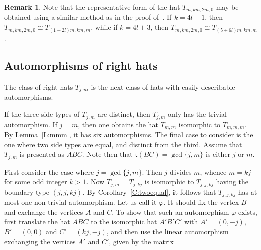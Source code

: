 \documentclass[12pt]{amsart}
\def\mf{\mathsf}
\def\p{\varphi}
\theoremstyle{plain}
\theoremstyle{definition}
\newtheorem{remark}[theorem]{Remark}
\numberwithin{equation}{section}
\begin{document}
\begin{remark}
Note that the representative form of the hat $T_{m,km,2m,0}$ may be obtained using a similar
method as in the proof of~\cite[Prop.~4.11]{MR25}.
If $k = 4l+1$, then $T_{m,km,2m,0}
\cong T_{(1+2l)m,km,m}$, while if $k = 4l+3$, then $T_{m,km,2m,0} \cong T_{(5+6l)m,km,m}$.
\end{remark}



\subsection{Automorphisms of right hats}\label{Sss: autrighthats}


The class of right hats $T_{j,m}$ is the next class of hats with easily describable automorphisms.

If the three side types of $T_{j,m}$ are distinct, then $T_{j,m}$ only has the trivial
automorphism. If $j = m$, then one obtains the hat $T_{m,m}$ isomorphic to $T_{m,m,m}$. By
Lemma~\ref{L:mmm}, it has six automorphisms. The final case to consider is the one where two side
types are equal, and distinct from the third. Assume that $T_{j,m}$ is presented as $ABC$.
Note then that $\mf{t}(BC) = \gcd\{j,m\}$ is either $j$ or $m$.

First consider the case where $j = \gcd\{j,m\}$. Then $j$ divides $m$, whence $m = kj$ for some
odd integer $k > 1$. Now $T_{j,m} = T_{j,kj}$ is isomorphic to $T_{j,j,kj}$  having the boundary type $(j,j,kj)$. By Corollary~\ref{C:twoequal}, it follows that $T_{j,j,kj}$ has at most one non-trivial automorphism. Let us call it $\p$.
It should fix the vertex $B$ and exchange the vertices $A$ and $C$. To show that such an
automorphism $\p$ exists, first translate the hat $ABC$ to the isomorphic hat $A'B'C'$ with $A' = (0,-j)$, $B' = (0,0)$ and $C' =(kj,-j)$, and then use the linear automorphism exchanging the vertices $A'$ and $C'$, given by the matrix
\end{document}
